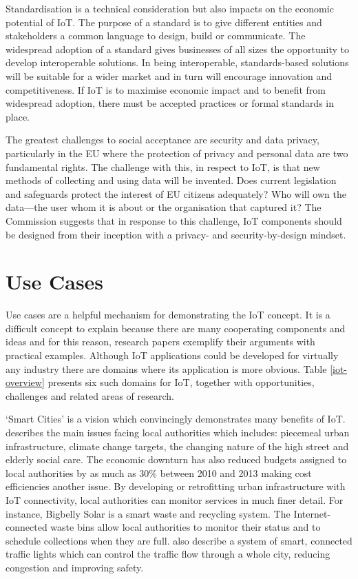     Standardisation is a technical consideration but also impacts on the economic potential of IoT. The purpose of a standard is to give different entities and stakeholders a common language to design, build or communicate. The widespread adoption of a standard gives businesses of all sizes the opportunity to develop interoperable solutions. In being interoperable, standards-based solutions will be suitable for a wider market and in turn will encourage innovation and competitiveness. If IoT is to maximise economic impact and to benefit from widespread adoption, there must be accepted practices or formal standards in place.

    The greatest challenges to social acceptance are security and data privacy, particularly in the EU where the protection of privacy and personal data are two fundamental rights. The challenge with this, in respect to IoT, is that new methods of collecting and using data will be invented. Does current legislation and safeguards protect the interest of EU citizens adequately? Who will own the data---the user whom it is about or the organisation that captured it? The Commission suggests that in response to this challenge, IoT components should be designed from their inception with a privacy- and security-by-design mindset.

  \section{Use Cases}
  \label{use-cases}
    Use cases are a helpful mechanism for demonstrating the IoT concept. It is a difficult concept to explain because there are many cooperating components and ideas and for this reason, research papers exemplify their arguments with practical examples. Although IoT applications could be developed for virtually any industry there are domains where its application is more obvious. Table \ref{iot-overview} presents six such domains for IoT, together with opportunities, challenges and related areas of research.

    `Smart Cities' is a vision which convincingly demonstrates many benefits of IoT. \citet{DfBIS:2013} describes the main issues facing local authorities which includes: piecemeal urban infrastructure, climate change targets, the changing nature of the high street and elderly social care. The economic downturn has also reduced budgets assigned to local authorities by as much as 30\% between 2010 and 2013 making cost efficiencies another issue. By developing or retrofitting urban infrastructure with IoT connectivity, local authorities can monitor services in much finer detail. For instance, Bigbelly Solar is a smart waste and recycling system. The Internet-connected waste bins allow local authorities to monitor their status and to schedule collections when they are full. \citet{fog:2012} also describe a system of smart, connected traffic lights which can control the traffic flow through a whole city, reducing congestion and improving safety.  


